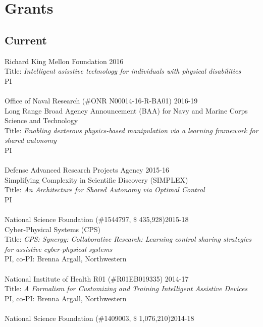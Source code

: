 
\section{Grants}

\subsection{Current}
\noindent
Richard King Mellon Foundation \hfill 2016\\
Title: \textit{Intelligent asisstive technology for individuals with physical disabilities}\\
PI\\
\\
Office of Naval Research (\#ONR N00014-16-R-BA01) \hfill 2016-19\\
Long Range Broad Agency Announcement (BAA) for Navy and Marine Corps Science and Technology\\
Title: \textit{Enabling dexterous physics-based manipulation via a learning framework for shared autonomy}\\
PI\\
\\
Defense Advanced Research Projects Agency \hfill 2015-16\\
Simplifying Complexity in Scientific Discovery (SIMPLEX)\\
Title: \textit{An Architecture for Shared Autonomy via Optimal Control}\\
PI\\
\\
National Science Foundation (\#1544797, \$ 435,928)\hfill 2015-18\\
Cyber-Physical Systems (CPS)\\
Title: \textit{CPS: Synergy: Collaborative Research: Learning control sharing strategies for assistive cyber-physical systems}\\
PI, co-PI: Brenna Argall, Northwestern\\
\\
National Institute of Health R01 (\#R01EB019335) \hfill 2014-17\\
Title: \textit{A Formalism for Customizing and Training Intelligent Assistive Devices}\\
PI, co-PI: Brenna Argall, Northwestern\\
\\
National Science Foundation (\#1409003, \$ 1,076,210)\hfill 2014-18\\

